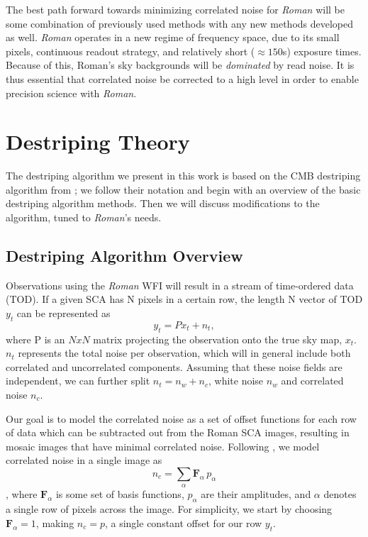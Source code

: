\documentclass[12pt]{pasj01}
\begin{document}
The best path forward towards minimizing correlated noise for \textit{Roman} will be some combination of previously used methods with any new methods developed as well. \textit{Roman} operates in a new regime of frequency space, due to its small pixels, continuous readout strategy, and relatively short ($\approx150$s) exposure times. Because of this, Roman's sky backgrounds will be \textit{dominated} by read noise. It is thus essential that correlated noise be corrected to a high level in order to enable precision science with \textit{Roman}.

\section{Destriping Theory}
\label{sec:theory}

The destriping algorithm we present in this work is based on the CMB destriping algorithm from \cite{Sutton2009}; we follow their notation and begin with an overview of the basic destriping algorithm methods. Then we will discuss modifications to the algorithm, tuned to \textit{Roman}'s needs.
 
\subsection{Destriping Algorithm Overview}
\label{subsec:labdata}

Observations using the \textit{Roman} WFI will result in a stream of time-ordered data (TOD). If a given SCA has N pixels in a certain row, the length N vector of TOD $y_t$ can be represented as \begin{equation}y_t = P x_t + n_t ,\label{eq:tod}\end{equation} where P is an $NxN$ matrix projecting the observation onto the true sky map, $x_t$. $n_t$ represents the total noise per observation, which will in general include both correlated and uncorrelated components. Assuming that these noise fields are independent, we can further split $n_t = n_w + n_c$, white noise $n_w$ and correlated noise $n_c$. 

Our goal is to model the correlated noise as a set of offset functions for each row of data which can be subtracted out from the Roman SCA images, resulting in mosaic images that have minimal correlated noise. Following \cite{Sutton2009}, we model correlated noise in a single image as 
\begin{equation}n_{c} = \sum_{\alpha} \textbf{F}_{\alpha}\,p_{\alpha}\label{eq:nc-simple}\end{equation}
, where $\textbf{F}_{\alpha}$ is some set of basis functions, $p_{\alpha}$ are their amplitudes, and $\alpha$ denotes a single row of pixels across the image. For simplicity, we start by choosing $\textbf{F}_{\alpha} = 1$, making $n_c = p$, a single constant offset for our row $y_t$.  
\end{document}
